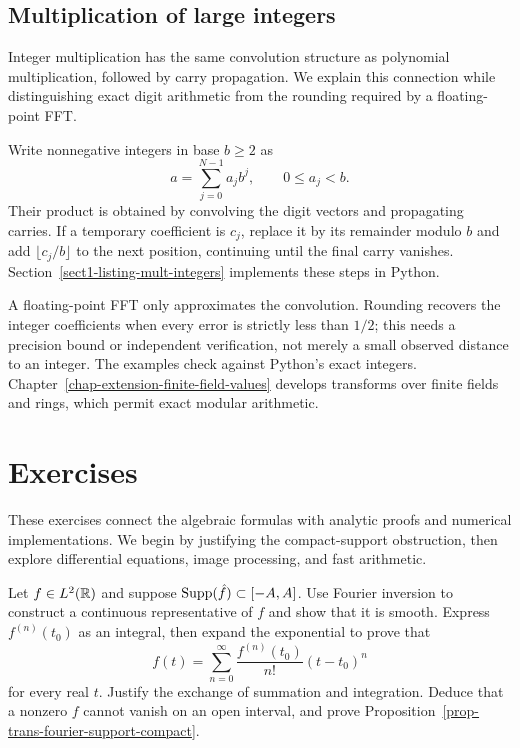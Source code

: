 \subsection{Multiplication of large integers}
\label{sect2-multiplication-integers}

Integer multiplication has the same convolution structure as polynomial
multiplication, followed by carry propagation. We explain this connection
while distinguishing exact digit arithmetic from the rounding required by a
floating-point FFT.

Write nonnegative integers in base $b\geq2$ as
\[
 a=\sum_{j=0}^{N-1}a_jb^j,\qquad 0\leq a_j<b.
\]
Their product is obtained by convolving the digit vectors and propagating
carries. If a temporary coefficient is $c_j$, replace it by its remainder
modulo $b$ and add $\lfloor c_j/b\rfloor$ to the next position, continuing
until the final carry vanishes. Section~\ref{sect1-listing-mult-integers}
implements these steps in Python.

A floating-point FFT only approximates the convolution. Rounding recovers
the integer coefficients when every error is strictly less than $1/2$;
this needs a precision bound or independent verification, not merely a
small observed distance to an integer. The examples check against Python's
exact integers. Chapter~\ref{chap-extension-finite-field-values} develops
transforms over finite fields and rings, which permit exact modular arithmetic.

\section{Exercises}
\label{sect1-chap3-exercises}

These exercises connect the algebraic formulas with analytic proofs and
numerical implementations. We begin by justifying the compact-support
obstruction, then explore differential equations, image processing, and fast
arithmetic.


\begin{exo}
\label{exo-transforme-sup-comp}
Let $f\in L^2(\mathbb{R})$ and suppose $\operatorname{Supp}(\hat{f})\subset[-A,A]$.
Use Fourier inversion to construct a continuous representative of $f$ and
show that it is smooth. Express $f^{(n)}(t_0)$ as an integral, then expand
the exponential to prove that
\[
 f(t)=\sum_{n=0}^\infty\frac{f^{(n)}(t_0)}{n!}(t-t_0)^n
\]
for every real $t$. Justify the exchange of summation and integration.
Deduce that a nonzero $f$ cannot vanish on an open interval, and prove
Proposition~\ref{prop-trans-fourier-support-compact}.
\end{exo}

